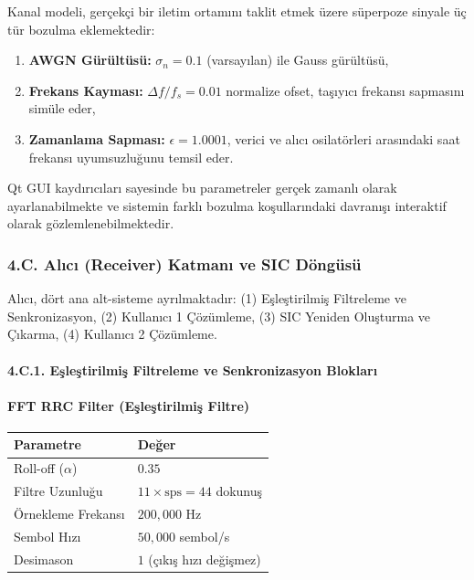 \documentclass[
]{IEEEtran}
\newcounter{none} %
\providecommand{\tightlist}{%
  \setlength{\itemsep}{0pt}\setlength{\parskip}{0pt}}
\begin{document}
Kanal modeli, gerçekçi bir iletim ortamını taklit etmek üzere süperpoze
sinyale üç tür bozulma eklemektedir:

\begin{enumerate}
\def\labelenumi{\arabic{enumi}.}
\tightlist
\item
  \textbf{AWGN Gürültüsü:} \(\sigma_n = 0.1\) (varsayılan) ile Gauss
  gürültüsü,
\item
  \textbf{Frekans Kayması:} \(\Delta f / f_s = 0.01\) normalize ofset,
  taşıyıcı frekansı sapmasını simüle eder,
\item
  \textbf{Zamanlama Sapması:} \(\epsilon = 1.0001\), verici ve alıcı
  osilatörleri arasındaki saat frekansı uyumsuzluğunu temsil eder.
\end{enumerate}

Qt GUI kaydırıcıları sayesinde bu parametreler gerçek zamanlı olarak
ayarlanabilmekte ve sistemin farklı bozulma koşullarındaki davranışı
interaktif olarak gözlemlenebilmektedir.

\subsubsection{4.C. Alıcı (Receiver) Katmanı ve SIC
Döngüsü}\label{c.-alux131cux131-receiver-katmanux131-ve-sic-duxf6nguxfcsuxfc}

Alıcı, dört ana alt-sisteme ayrılmaktadır: (1) Eşleştirilmiş Filtreleme
ve Senkronizasyon, (2) Kullanıcı 1 Çözümleme, (3) SIC Yeniden Oluşturma
ve Çıkarma, (4) Kullanıcı 2 Çözümleme.

\paragraph{4.C.1. Eşleştirilmiş Filtreleme ve Senkronizasyon
Blokları}\label{c.1.-eux15fleux15ftirilmiux15f-filtreleme-ve-senkronizasyon-bloklarux131}

\paragraph{FFT RRC Filter (Eşleştirilmiş
Filtre)}\label{fft-rrc-filter-eux15fleux15ftirilmiux15f-filtre}

{\def\LTcaptype{none} %
\begin{longtable}[]{@{}ll@{}}
\toprule\noalign{}
Parametre & Değer \\
\midrule\noalign{}
\endhead
\bottomrule\noalign{}
\endlastfoot
Roll-off (\(\alpha\)) & \(0.35\) \\
Filtre Uzunluğu & \(11 \times \text{sps} = 44\) dokunuş \\
Örnekleme Frekansı & \(200{,}000\) Hz \\
Sembol Hızı & \(50{,}000\) sembol/s \\
Desimason & \(1\) (çıkış hızı değişmez) \\
\end{longtable}
}
\end{document}
